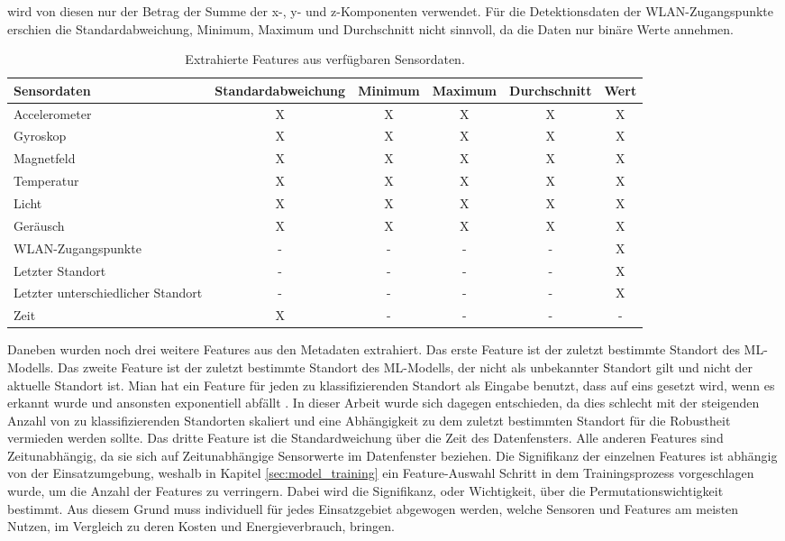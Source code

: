 wird von diesen nur der Betrag der Summe der x-, y- und z-Komponenten verwendet.
Für die Detektionsdaten der WLAN-Zugangspunkte erschien die Standardabweichung, Minimum, Maximum und Durchschnitt nicht sinnvoll, da die Daten nur binäre Werte annehmen.
\begin{table}[h!]
    \hspace{-0.5cm}
    \begin{tabular}{ | p{3.2cm} | c | c | c | c | c | }
        \hline
        Sensordaten & Standardabweichung & Minimum & Maximum & Durchschnitt & Wert \\\hline
        Accelerometer & X & X & X & X & X \\\hline
        Gyroskop & X & X & X & X & X \\\hline
        Magnetfeld & X & X & X & X & X \\\hline
        Temperatur & X & X & X & X & X \\\hline
        Licht & X & X & X & X & X \\\hline
        Geräusch & X & X & X & X & X \\\hline
        WLAN-Zugangspunkte & - & - & - & - & X \\\hline
        Letzter Standort & - & - & - & - & X \\\hline
        Letzter unterschiedlicher Standort & - & - & - & - & X \\\hline
        Zeit & X & - & - & - & - \\\hline
    \end{tabular}
    \caption{Extrahierte Features aus verfügbaren Sensordaten.}
    \label{tab:all_features}
\end{table}
\newline
\newline
Daneben wurden noch drei weitere Features aus den Metadaten extrahiert.
Das erste Feature ist der zuletzt bestimmte Standort des ML-Modells.
Das zweite Feature ist der zuletzt bestimmte Standort des ML-Modells, der nicht als unbekannter Standort gilt und nicht der aktuelle Standort ist.
Mian hat ein Feature für jeden zu klassifizierenden Standort als Eingabe benutzt, dass auf eins gesetzt wird, wenn es erkannt wurde und ansonsten exponentiell abfällt \cite{naveedThesis}.
In dieser Arbeit wurde sich dagegen entschieden, da dies schlecht mit der steigenden Anzahl von zu klassifizierenden Standorten skaliert
und eine Abhängigkeit zu dem zuletzt bestimmten Standort für die Robustheit vermieden werden sollte.
Das dritte Feature ist die Standardweichung über die Zeit des Datenfensters.
Alle anderen Features sind Zeitunabhängig, da sie sich auf Zeitunabhängige Sensorwerte im Datenfenster beziehen.
\newline
\newline
Die Signifikanz der einzelnen Features ist abhängig von der Einsatzumgebung, weshalb in Kapitel \ref{sec:model_training}
ein Feature-Auswahl Schritt in dem Trainingsprozess vorgeschlagen wurde, um die Anzahl der Features zu verringern.
Dabei wird die Signifikanz, oder Wichtigkeit, über die Permutationswichtigkeit bestimmt.
Aus diesem Grund muss individuell für jedes Einsatzgebiet abgewogen werden, welche Sensoren und Features am meisten Nutzen,
im Vergleich zu deren Kosten und Energieverbrauch, bringen.

